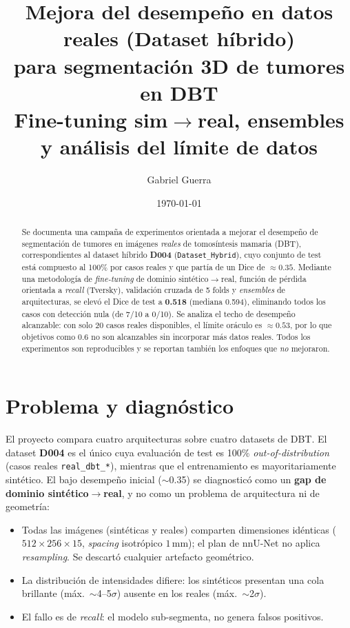 \documentclass[11pt]{article}
\title{\textbf{Mejora del desempeño en datos reales (Dataset híbrido) \\
para segmentación 3D de tumores en DBT}\\[4pt]
\large Fine-tuning sim$\rightarrow$real, ensembles y análisis del límite de datos}
\author{Gabriel Guerra}
\date{\today}
\newcommand{\best}[1]{\textbf{#1}}
\begin{document}
\maketitle

\begin{abstract}
\noindent Se documenta una campaña de experimentos orientada a mejorar el desempeño
de segmentación de tumores en imágenes \emph{reales} de tomosíntesis mamaria (DBT),
correspondientes al dataset híbrido \textbf{D004} (\texttt{Dataset\_Hybrid}),
cuyo conjunto de test está compuesto al 100\% por casos reales y que partía de un
Dice de $\approx 0.35$. Mediante una metodología de \emph{fine-tuning} de dominio
sintético$\rightarrow$real, función de pérdida orientada a \emph{recall} (Tversky),
validación cruzada de 5 folds y \emph{ensembles} de arquitecturas, se elevó el Dice
de test a \best{0.518} (mediana 0.594), eliminando todos los casos con detección nula
(de 7/10 a 0/10). Se analiza el techo de desempeño alcanzable: con solo 20 casos reales
disponibles, el límite oráculo es $\approx 0.53$, por lo que objetivos como $0.6$
no son alcanzables sin incorporar más datos reales. Todos los experimentos son
reproducibles y se reportan también los enfoques que \emph{no} mejoraron.
\end{abstract}

\section{Problema y diagnóstico}
El proyecto compara cuatro arquitecturas sobre cuatro datasets de DBT. El dataset
\textbf{D004} es el único cuya evaluación de test es 100\% \emph{out-of-distribution}
(casos reales \texttt{real\_dbt\_*}), mientras que el entrenamiento es mayoritariamente
sintético. El bajo desempeño inicial ($\sim$0.35) se diagnosticó como un
\textbf{gap de dominio sintético$\rightarrow$real}, y no como un problema de
arquitectura ni de geometría:
\begin{itemize}\itemsep2pt
  \item Todas las imágenes (sintéticas y reales) comparten dimensiones idénticas
        ($512\times256\times15$, \emph{spacing} isotrópico $1$\,mm); el plan de nnU-Net
        no aplica \emph{resampling}. Se descartó cualquier artefacto geométrico.
  \item La distribución de intensidades difiere: los sintéticos presentan una cola
        brillante (máx.\ $\sim$4--5$\sigma$) ausente en los reales (máx.\ $\sim$2$\sigma$).
  \item El fallo es de \emph{recall}: el modelo sub-segmenta, no genera falsos positivos.
\end{itemize}
\end{document}
